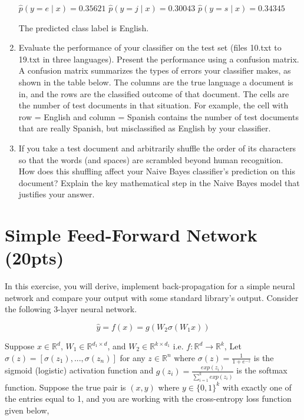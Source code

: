 \documentclass[a4paper]{article}
\theoremstyle{definition}
\newenvironment{soln}{
    \leavevmode\color{blue}\ignorespaces
}{}
\begin{document}
\begin{enumerate}
\begin{soln}
    $\hat p(y=e \mid x) = 0.35621$
    $\hat p(y=j \mid x) = 0.30043$
    $\hat p(y=s \mid x) = 0.34345$

    The predicted class label is English.
\end{soln}


\item
Evaluate the performance of your classifier on the test set (files 10.txt to 19.txt in three languages).
Present the performance using a confusion matrix. A confusion matrix summarizes the types of errors your classifier makes, as shown in the table below.   The columns are the true language a document is in, and the rows are the classified outcome of that document.  The cells are the number of test documents in that situation.  For example, the cell with row = English and column = Spanish contains the number of test documents that are really Spanish, but misclassified as English by your classifier.

\item If you take a test document and arbitrarily shuffle the order of its characters so that the words (and spaces) are scrambled beyond human recognition.  How does this shuffling affect your Naive Bayes classifier's prediction on this document?  Explain the key mathematical step in the Naive Bayes model that justifies your answer.

\end{enumerate}

\section{Simple Feed-Forward Network (20pts)}
In this exercise, you will derive, implement back-propagation for a simple neural network and compare your output with some standard library’s output. Consider the following 3-layer neural network.

\[
\hat{y} = f(x) = g(W_2\sigma(W_1x))
\]

Suppose $x \in \mathbb{R}^d$, $W_1 \in \mathbb{R}^{d_1 \times d}$, and $W_2 \in \mathbb{R}^{k \times d_1}$ i.e. $f: \mathbb{R}^d \rightarrow \mathbb{R}^k$, Let $\sigma(z) = [\sigma(z_1), ..., \sigma(z_n)]$ for any $z \in \mathbb{R}^n$ where $\sigma(z) = \frac{1}{1 + e^{-z}}$ is the sigmoid (logistic) activation function and $g(z_i) = \frac{exp(z_i)}{\sum_{i=1}^k exp(z_i)}$ is the softmax function. Suppose the true pair is $(x, y)$ where $y \in \{0, 1\}^k$ with exactly one of the entries equal to 1, and you are working with the cross-entropy loss function given below,
\end{document}
